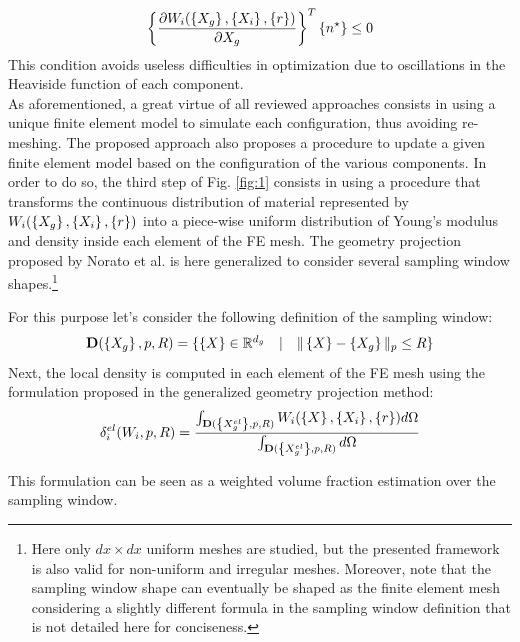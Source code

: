  \begin{equation}
     \left\{{\frac{\partial W_i(\left\{{X_g}\right\},\left\{{X_i}\right\},\left\{{r}\right\})}{\partial X_g}}\right\}^T \left\{{n^\star}\right\}  \leq 0
 \end{equation}
 This condition avoids useless difficulties in optimization due to oscillations in the Heaviside function of each component.\\
 As aforementioned, a great virtue of all reviewed approaches consists in using a unique finite element model to simulate each configuration, thus avoiding re-meshing. The proposed approach also proposes a procedure to update a given finite element model based on the configuration of the various components. In order to do so, the third step of Fig. \ref{fig:1} consists in using a procedure that transforms the continuous distribution of material represented by $W_i(\left\{{X_g}\right\},\left\{{X_i}\right\},\left\{{r}\right\})$ into a piece-wise uniform distribution of Young's modulus and density inside each element of the FE mesh. The geometry projection proposed by Norato et al. \cite{norato2004geometry} is here generalized to consider several sampling window shapes.\footnote{Here only $dx\times dx$ uniform meshes are studied, but the presented framework is also valid for non-uniform and irregular meshes. Moreover, note that the sampling window shape can eventually be shaped as the finite element mesh considering a slightly different formula in the sampling window definition that is not detailed here for conciseness.}
 
 For this purpose let's consider the following definition of the sampling window:
 \begin{equation}
 \begin{array}{ccc}
     \mathbf{D}(\left\{{X_g}\right\},p,R)=\lbrace \left\{{X}\right\}\in \mathbb{R}^{d_g} & | & \|\left\{{X}\right\}-\left\{{X_g}\right\}\|_{p} \leq R  \rbrace
     \end{array}
 \end{equation}
 Next, the local density is computed in each element of the FE mesh using the formulation proposed in the generalized geometry projection method: 
 \begin{equation}
 \label{eq. ro}
     \delta_i^{el}(W_i,p,R)=\frac{\int_{\mathbf{D}(\left\{{X_g^{el}}\right\},p,R)}{W_i(\left\{{X}\right\},\left\{{X_i}\right\},\left\{{r}\right\})d\Omega}}{\int_{\mathbf{D}(\left\{{X^{el}_g}\right\},p,R)}{d\Omega}}
 \end{equation}

 This formulation can be seen as a weighted volume fraction estimation over the sampling window.
 

